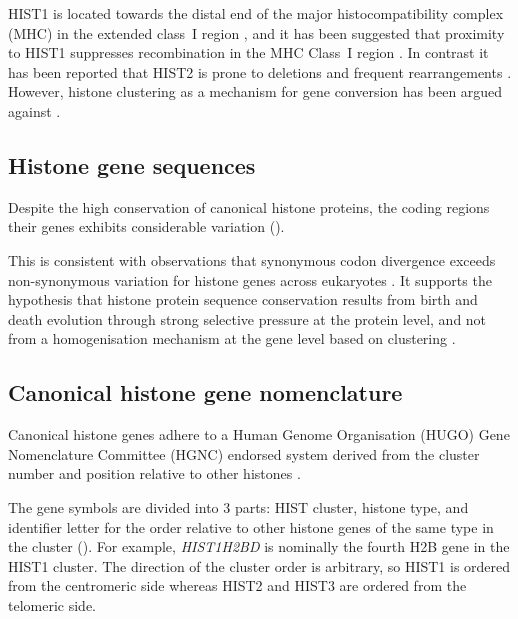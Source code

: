 	HIST1 is located towards the distal end of the major histocompatibility complex (MHC) 
	in the extended class~I region \citep{MHC-I-transcript, MHC-complete-sequencing-1999}, 
	and it has been suggested that proximity to HIST1 
	suppresses recombination in the MHC Class~I region \citep{MHC-repressed-by-HIST}. 
	In contrast it has been reported that HIST2 is prone to 
	deletions and frequent rearrangements \citep{HISTTwo-prone-deletion-discovery, HISTTwo-prone-deletion-focus}.
	However, histone clustering as a mechanism for gene conversion has been argued against \citep{NeiRooney2005}.

\subsection{Histone gene sequences}
	Despite the high conservation of canonical histone proteins, 
	the coding regions their genes exhibits considerable variation ().


	This is consistent with observations that 
	synonymous codon divergence exceeds non-synonymous variation 
	for histone genes across eukaryotes \citep{Piontkivska2002, Rooney2002}. 
	It supports the hypothesis that histone protein sequence conservation 
	results from birth and death evolution through strong selective pressure at the protein level, 
	and not from a homogenisation mechanism at the gene level based on clustering \citep{NeiRooney2005}.

\subsection{Canonical histone gene nomenclature}
	Canonical histone genes adhere to a Human Genome Organisation (HUGO) Gene Nomenclature Committee (HGNC) 
	endorsed system derived from the cluster number and position relative to other histones \citep{Marzluff02}.

	The gene symbols are divided into 3 parts: 
	HIST cluster, histone type, and identifier letter
	for the order relative to other histone genes of the same type in the cluster ().
	For example, \textit{HIST1H2BD} is nominally the fourth H2B gene in the HIST1 cluster.
	The direction of the cluster order is arbitrary, 
	so HIST1 is ordered from the centromeric side 
	whereas HIST2 and HIST3 are ordered from the telomeric side.


